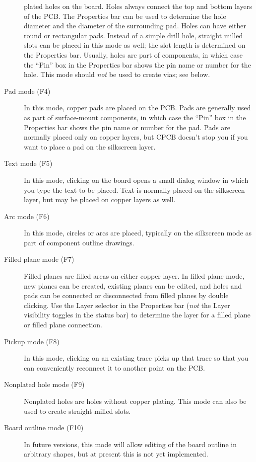 \documentclass[11pt]{report}
\begin{document}
\begin{description}
      plated holes on the board. Holes always connect the top and
      bottom layers of the PCB. The Properties bar can be used to
      determine the hole diameter and the diameter of the surrounding
      pad. Holes can have either round or rectangular pads. Instead of
      a simple drill hole, straight milled slots can be placed in this
      mode as well; the slot length is determined on the Properties
      bar. Usually, holes are part of components, in which case the
      ``Pin'' box in the Properties bar shows the pin name or number
      for the hole. This mode should \emph{not} be used to create
      vias; see below.
\item[Pad mode (F4)] In this mode, copper pads are placed on the
  PCB. Pads are generally used as part of surface-mount components, in
  which case the ``Pin'' box in the Properties bar shows the pin name
  or number for the pad.  Pads are normally placed only on copper
  layers, but CPCB doesn't stop you if you want to place a pad on the
  silkscreen layer.
\item[Text mode (F5)] In this mode, clicking on the board opens a
  small dialog window in which you type the text to be placed. Text is
  normally placed on the silkscreen layer, but may be placed on copper
  layers as well.
  \item[Arc mode (F6)] In this mode, circles or arcs are placed,
    typically on the silkscreen mode as part of component outline
    drawings.
    \item[Filled plane mode (F7)] Filled planes are filled areas on
      either copper layer. In filled plane mode, new planes can be
      created, existing planes can be edited, and holes and pads can
      be connected or disconnected from filled planes by double
      clicking. Use the Layer selector in the Properties bar
      (\emph{not} the Layer visibility toggles in the status bar) to
      determine the layer for a filled plane or filled plane
      connection.
      \item[Pickup mode (F8)] In this mode, clicking on an existing
        trace picks up that trace so that you can conveniently
        reconnect it to another point on the PCB.
      \item[Nonplated hole mode (F9)] Nonplated holes are holes
        without copper plating. This mode can also be used to create
        straight milled slots.
      \item[Board outline mode (F10)] In future versions, this
        mode will allow editing of the board outline in arbitrary
        shapes, but at present this is not yet implemented.
\end{description}
\end{document}
